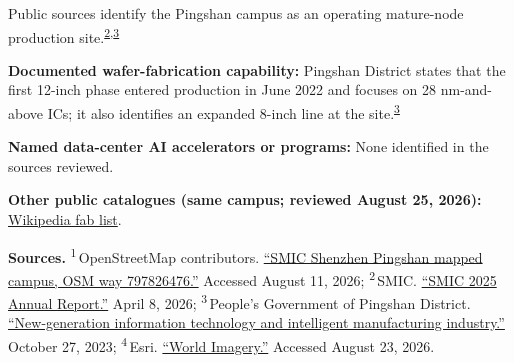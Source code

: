 \begin{minipage}[t][0.90\textheight][t]{\textwidth}
\begin{minipage}[t]{\textwidth}
\begin{minipage}[t]{0.32\textwidth}
\medskip
{\footnotesize Public sources identify the Pingshan campus as an operating mature-node production site.\nobreak\textsuperscript{\href{\detokenize{https://www1.hkexnews.hk/listedco/listconews/sehk/2026/0408/2026040801181.pdf}}{\textcolor{accent}{2}},\href{\detokenize{https://www.szpsq.gov.cn/english/From}\%\detokenize{20Pingshan}\%\detokenize{20to}\%\detokenize{20the}\%\detokenize{20World/Key}\%\detokenize{20Industries}\%\detokenize{20amp}\%\detokenize{3Bamp}\%\detokenize{3Bamp}\%\detokenize{3B}\%\detokenize{20Bonded}\%\detokenize{20Zone/content/post_10912456.html}}{\textcolor{accent}{3}}}\par}
\medskip
{\footnotesize\textbf{Documented wafer-fabrication capability:} Pingshan District states that the first 12-inch phase entered production in June 2022 and focuses on 28 nm-and-above ICs; it also identifies an expanded 8-inch line at the site.\nobreak\textsuperscript{\href{\detokenize{https://www.szpsq.gov.cn/english/From}\%\detokenize{20Pingshan}\%\detokenize{20to}\%\detokenize{20the}\%\detokenize{20World/Key}\%\detokenize{20Industries}\%\detokenize{20amp}\%\detokenize{3Bamp}\%\detokenize{3Bamp}\%\detokenize{3B}\%\detokenize{20Bonded}\%\detokenize{20Zone/content/post_10912456.html}}{\textcolor{accent}{3}}}\par}
\end{minipage}
\end{minipage}
\par\vspace{0.65em}
\medskip
{\footnotesize\textbf{Named data-center AI accelerators or programs:} None identified in the sources reviewed.\par}
\smallskip
{\sffamily\scriptsize\color{black!62}\textbf{Other public catalogues (same campus; reviewed August 25, 2026):} \href{\detokenize{https://en.wikipedia.org/w/index.php?title=List_of_semiconductor_fabrication_plants&oldid=1370451124}\#\detokenize{Open_plants}}{Wikipedia fab list}.\par}
\medskip
{\sffamily\scriptsize\setlength{\emergencystretch}{1.5em}\textbf{Sources.} \textsuperscript{1}\,OpenStreetMap contributors. \href{\detokenize{https://www.openstreetmap.org/way/797826476}}{\enquote{SMIC Shenzhen Pingshan mapped campus, OSM way 797826476.}} Accessed August 11, 2026; \textsuperscript{2}\,SMIC. \href{\detokenize{https://www1.hkexnews.hk/listedco/listconews/sehk/2026/0408/2026040801181.pdf}}{\enquote{SMIC 2025 Annual Report.}} April 8, 2026; \textsuperscript{3}\,People's Government of Pingshan District. \href{\detokenize{https://www.szpsq.gov.cn/english/From}\%\detokenize{20Pingshan}\%\detokenize{20to}\%\detokenize{20the}\%\detokenize{20World/Key}\%\detokenize{20Industries}\%\detokenize{20amp}\%\detokenize{3Bamp}\%\detokenize{3Bamp}\%\detokenize{3B}\%\detokenize{20Bonded}\%\detokenize{20Zone/content/post_10912456.html}}{\enquote{New-generation information technology and intelligent manufacturing industry.}} October 27, 2023; \textsuperscript{4}\,Esri. \href{\detokenize{https://www.arcgis.com/home/item.html?id=10df2279f9684e4a9f6a7f08febac2a9}}{\enquote{World Imagery.}} Accessed August 23, 2026.\par}

\end{minipage}
